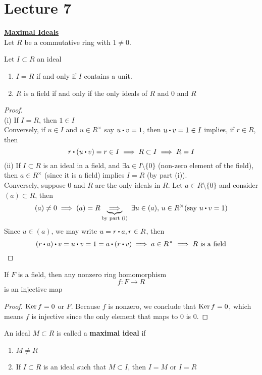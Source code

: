 \documentclass[../Main.tex]{subfiles}
\begin{document}
\chapter{Lecture 7}
\underline{\textbf{\Large Maximal Ideals}}~\\
Let $R$ be a commutative ring with $1\ne 0$.
\begin{prop}
	Let $I\subset R$ an ideal
	\begin{enumerate}
		\item $I=R$ if and only if $I$ contains a unit.
		\item $R$ is a field if and only if the only ideals of $R$ and $0$ and $R$
	\end{enumerate}
\end{prop}
\begin{proof}~\\
	(i) If $I=R$, then $1\in I$\\
	Conversely, if $u\in I$ and $u\in R^\times$ say $u\rdot v=1$, then $u\rdot v=1\in I$ implies, if $r \in R$, then 
	\[r\rdot (u\rdot v)=r\in I \implies R\subset I \implies R=I\]
	(ii) If $I\subset R$ is an ideal in a field, and $\exists a \in I \setminus \{0\}$ (non-zero element of the field), then $a\in R^\times$ (since it is a field) implies $I=R$ (by part (i)).\\
	Conversely, suppose $0$ and $R$ are the only ideals in $R$. Let $a\in R\setminus \{0\}$ and consider $(a)\subset R$, then
	\[(a)\ne 0 \implies (a)=R \underbrace{\implies}_{\text{by part (i)}} \,\,\exists u\in (a), \, u \in R^\times (\text{say } u\rdot v=1)\]
	Since $u\in (a)$, we may write $u=r\rdot a, r\in R$, then
	\[(r\rdot a)\rdot v=u\rdot v=1=a\rdot (r\rdot v)\implies a\in R^\times \implies R \text{ is a field}\]
\end{proof}
\begin{crl}
	If $F$ is a field, then any nonzero ring homomorphism
	\[f: F\to R\]
	is an injective map
\end{crl}
\begin{proof}
	$\operatorname{Ker} f =0$ or $F$. Because $f$ is nonzero, we conclude that $\operatorname{Ker} f =0$, which means $f$ is injective since the only element that maps to $0$ is $0$.
\end{proof}
\begin{dfn}[title = Maximal Ideal]
	An ideal $M\subset R$ is called a \textbf{maximal ideal} if
	\begin{enumerate}
		\item $M\ne R$
		\item If $I\subset R$ is an ideal such that $M\subset I$, then $I=M$ or $I=R$
	\end{enumerate}
\end{dfn}
\end{document}
